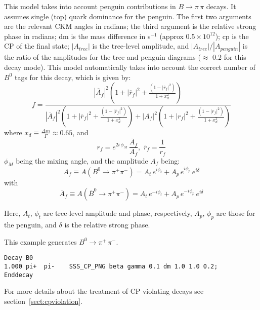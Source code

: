 \Expl
This model takes into account penguin contributions in $B \rightarrow \pi \,\pi$ decays.  It assumes single (top) quark dominance for the penguin.  The first two arguments are the relevant CKM angles in radians; the third argument is the relative strong phase in radians; dm is the mass difference
in s$^{-1}$ (approx $0.5\times 10^{12}$); cp is the CP of the final state; $|A_{tree}|$ is the tree-level amplitude, and ${|A_{tree}|}/{|A_{penguin}|}$ is the ratio of the amplitudes for the tree and penguin diagrams ($\approx$ 0.2 for this decay mode).  This model automatically takes into account the correct number of $B^{0}$ tags for this decay, which is given by:
\begin{equation}
f =  \frac{|\overline{A}_{f}|^2 \left(1 + |\overline{r}_{f}|^2 + \frac{(1 - |\overline{r}_{f}|^2)}{1+x_{d}^2} \right)}{|\overline{A}_{f}|^2 \left(1 + |\overline{r}_{f}|^2 + \frac{(1 - |\overline{r}_{f}|^2)}{1+x_{d}^2} \right) + |{A}_{f}|^2 \left(1 + |r_{f}|^2 + \frac{(1 - |r_{f}|^2)}{1+x_{d}^2} \right)}
\end{equation}    
where $x_{d} \equiv \frac{\Delta m}{\Gamma} \approx 0.65$, and  
\begin{equation}
r_{f} = e^{2i\,\phi_{M}}\,\frac{\overline{A}_{f}}{A_{f}}, \,\,\overline{r}_{f} = \frac{1}{r_{f}}
\end{equation}
$\phi_{M}$ being the mixing angle, and the amplitude $A_{f}$ being:
\begin{equation}
A_{f} \equiv A(B^{0} \rightarrow \pi^{+} \pi^{-}) = A_{t}\,e^{i\phi_{t}} + A_{p}\,e^
{i\phi_{p}}\,e^{i\delta}
\end{equation}
with
\begin{equation}
\overline{A}_{f} \equiv A(\overline{B}^{0} \rightarrow \pi^{+} \pi^{-}) = A_{t}\,e^{-i\phi_{t}} + A_{p}\,e^{-i\phi_{p}}\,e^{i\delta}
\end{equation}

Here, $A_{t}$, $\phi_{t}$ are tree-level amplitude and phase, respectively, $A_{p}$, $\phi_{p}$
 are those for the penguin, and $\delta$ is the relative strong phase.


\Example
This example generates $B^{0} \rightarrow \pi^{+}\, \pi^{-}$.
\begin{verbatim}
Decay B0
1.000 pi+  pi-    SSS_CP_PNG beta gamma 0.1 dm 1.0 1.0 0.2;
Enddecay
\end{verbatim}

\Notes
For more details about the treatment of CP violating decays 
see section~\ref{sect:cpviolation}.


